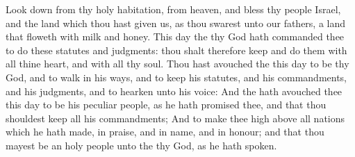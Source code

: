 \begin{biblechapter}
\verse Look down from thy holy habitation, from heaven, and bless thy people Israel, and the land which thou hast given us, as thou swarest unto our fathers, a land that floweth with milk and honey.
 This day the \LORD thy God hath commanded thee to do these statutes and judgments: thou shalt therefore keep and do them with all thine heart, and with all thy soul.
\verse Thou hast avouched the \LORD this day to be thy God, and to walk in his ways, and to keep his statutes, and his commandments, and his judgments, and to hearken unto his voice:
\verse And the \LORD hath avouched thee this day to be his peculiar people, as he hath promised thee, and that thou shouldest keep all his commandments;
\verse And to make thee high above all nations which he hath made, in praise, and in name, and in honour; and that thou mayest be an holy people unto the \LORD thy God, as he hath spoken.
\end{biblechapter}

